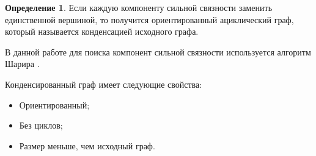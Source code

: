 \documentclass[12pt,a4paper,oneside,openany]{article}
\theoremstyle{definition}
\newtheorem{definition}{Определение}[]
\theoremstyle{lemma}
\theoremstyle{remark}
\begin{document}
\begin{definition}\label{def:condensation}
Если каждую компоненту сильной связности заменить единственной вершиной, то получится ориентированный ациклический граф, который называется конденсацией исходного графа.
\end{definition}

В данной работе для поиска компонент сильной связности используется алгоритм Шарира \cite{sharir1981strong}.

Конденсированный граф имеет следующие свойства:
    \begin{itemize}
        \item Ориентированный;
        \item Без циклов;
        \item Размер меньше, чем исходный граф.
    \end{itemize}
\end{document}
